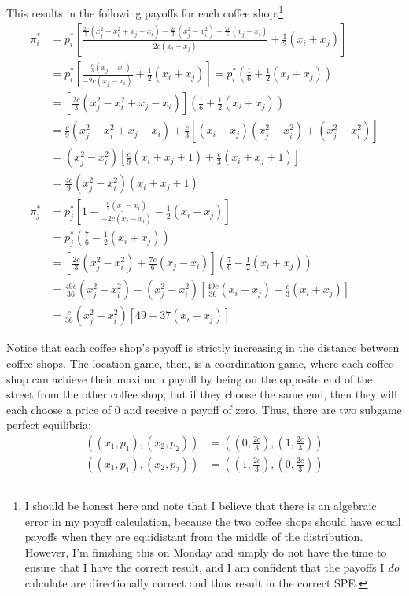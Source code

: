 \documentclass{article}
\begin{document}
This results in the following payoffs for each coffee shop:\footnote{I should be honest here and note that I believe that there is an algebraic error in my payoff calculation, because the two coffee shops should have equal payoffs when they are equidistant from the middle of the distribution. However, I'm finishing this on Monday and simply do not have the time to ensure that I have the correct result, and I am confident that the payoffs I \textit{do} calculate are directionally correct and thus result in the correct SPE.}
\begin{align*}
	\pi_i^*				&= p_i^*\left[\frac{\frac{2c}{3}\left(x_j^2 - x_i^2+x_j-x_i\right) - \frac{2c}{3}\left(x_j^2 - x_i^2\right) + \frac{7c}{6}\left(x_j-x_i\right)}{2c(x_i - x_j)} + \frac{1}{2}(x_i + x_j)\right]	\\
						&= p_i^*\left[\frac{-\frac{c}{3}(x_j-x_i)}{-2c(x_j-x_i)}+\frac{1}{2}(x_i+x_j)\right] = p_i^*\left(\frac{1}{6} + \frac{1}{2}(x_i+x_j)\right)	\\
						&= \left[\frac{2c}{3}\left(x_j^2 - x_i^2+x_j-x_i\right)\right]\left(\frac{1}{6} + \frac{1}{2}(x_i+x_j)\right)	\\
						&= \frac{c}{9}\left(x_j^2 - x_i^2+x_j-x_i\right) + \frac{c}{3}\left[(x_i+x_j)(x_j^2 - x_i^2) + (x_j^2 - x_i^2)\right]	\\
						&= \left(x_j^2 - x_i^2\right)\left[\frac{c}{9}(x_i + x_j + 1)+\frac{c}{3}(x_i + x_j + 1)\right]							\\
						&= \frac{4c}{9}\left(x_j^2 - x_i^2\right)(x_i + x_j + 1)																\\
	\pi_j^*				&= p_j^*\left[1-\frac{\frac{c}{3}(x_j-x_i)}{-2c(x_j-x_i)}-\frac{1}{2}(x_i + x_j)\right]									\\
						&= p_j^*\left(\frac{7}{6}-\frac{1}{2}(x_i + x_j)\right)																	\\
						&= \left[\frac{2c}{3}\left(x_j^2 - x_i^2\right) + \frac{7c}{6}\left(x_j-x_i\right)\right]\left(\frac{7}{6}-\frac{1}{2}(x_i + x_j)\right)	\\
						&= \frac{49c}{36}\left(x_j^2 - x_i^2\right) + \left(x_j^2 - x_i^2\right) \left[\frac{49c}{36}(x_i + x_j) - \frac{c}{3}(x_i + x_j)\right]	\\
						&= \frac{c}{36}\left(x_j^2 - x_i^2\right)\left[49 + 37(x_i + x_j)\right]
\end{align*} 

Notice that each coffee shop's payoff is strictly increasing in the distance between coffee shops. The location game, then, is a coordination game, where each coffee shop can achieve their maximum payoff by being on the opposite end of the street from the other coffee shop, but if they choose the same end, then they will each choose a price of 0 and receive a payoff of zero. Thus, there are two subgame perfect equilibria:
\begin{align*}
	\left(\left(x_1,p_1\right),\left(x_2,p_2\right)\right) &= \left(\left(0,\frac{2c}{3}\right),\left(1,\frac{2c}{3}\right)\right) \\
	\left(\left(x_1,p_1\right),\left(x_2,p_2\right)\right) &= \left(\left(1,\frac{2c}{3}\right),\left(0,\frac{2c}{3}\right)\right) 
\end{align*} 

	


\end{document}
